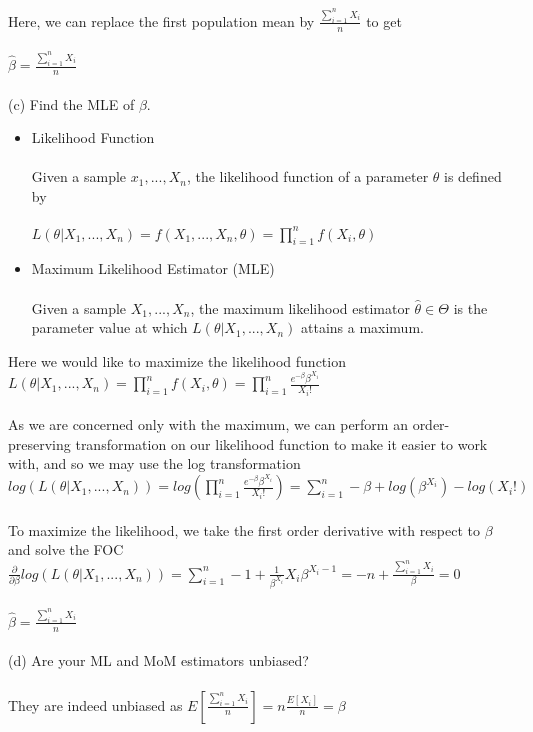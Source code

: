 \documentclass{article}
\begin{document}
Here, we can replace the first population mean by $\frac{\sum_{i=1}^nX_i}{n}$ to get \\\\
$\hat{\beta}=\frac{\sum_{i=1}^nX_i}{n}$\\\\
(c)  Find the MLE of $\beta$.
\begin{itemize}
    \item Likelihood Function\\\\
    Given a sample $x_1,...,X_n$, the likelihood function of a parameter $\theta$ is defined by\\\\
    $L(\theta|X_1,...,X_n)=f(X_1,...,X_n,\theta)=\prod_{i=1}^nf(X_i,\theta)$
    \item Maximum Likelihood Estimator (MLE)\\\\
    Given a sample $X_1,...,X_n$, the maximum likelihood estimator $\hat{\theta}\in\Theta$ is the parameter value at which $L(\theta|X_1,...,X_n)$ attains a maximum.
\end{itemize}
Here we would like to maximize the likelihood function\\ $L(\theta|X_1,...,X_n)=\prod_{i=1}^nf(X_i,\theta)=\prod_{i=1}^n\frac{e^{-\beta}\beta^{X_i}}{X_i!}$\\\\
As we are concerned only with the maximum, we can perform an order-preserving transformation on our likelihood function to make it easier to work with, and so we may use the log transformation\\
$log(L(\theta|X_1,...,X_n))=log(\prod_{i=1}^n\frac{e^{-\beta}\beta^{X_i}}{X_i!})=\sum_{i=1}^n-\beta+log(\beta^{X_i})-log(X_i!)$\\\\
To maximize the likelihood, we take the first order derivative with respect to $\beta$ and solve the FOC\\
$\frac{\partial}{\partial \beta}log(L(\theta|X_1,...,X_n))=\sum_{i=1}^n-1+\frac{1}{\beta^{X_i}}X_i\beta^{X_i-1}=-n+\frac{\sum_{i=1}^nX_i}{\beta}=0$\\\\
$\hat{\beta}=\frac{\sum_{i=1}^nX_i}{n}$\\\\
(d) Are your ML and MoM estimators unbiased?\\\\
They are indeed unbiased as $E[\frac{\sum_{i=1}^nX_i}{n}]=n\frac{E[X_i]}{n}=\beta$\\\\
\end{document}
